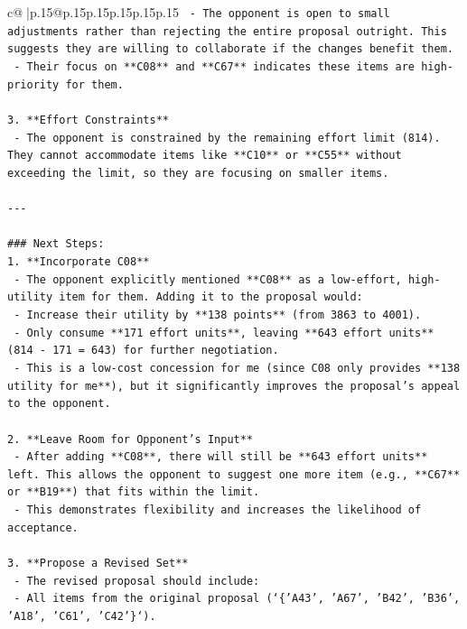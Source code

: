 \documentclass{article}
\begin{document}
{\begin{supertabular}{c@{$\;$}|p{.15\linewidth}@{}p{.15\linewidth}p{.15\linewidth}p{.15\linewidth}p{.15\linewidth}p{.15\linewidth}}
{{{\texttt{   {-} The opponent is open to small adjustments rather than rejecting the entire proposal outright. This suggests they are willing to collaborate if the changes benefit them.} \\
\texttt{   {-} Their focus on **C08** and **C67** indicates these items are high{-}priority for them.} \\
\\ 
\texttt{3. **Effort Constraints**} \\
\texttt{   {-} The opponent is constrained by the remaining effort limit (814). They cannot accommodate items like **C10** or **C55** without exceeding the limit, so they are focusing on smaller items.} \\
\\ 
\texttt{{-}{-}{-}} \\
\\ 
\texttt{\#\#\# Next Steps:} \\
\texttt{1. **Incorporate C08**} \\
\texttt{   {-} The opponent explicitly mentioned **C08** as a low{-}effort, high{-}utility item for them. Adding it to the proposal would:} \\
\texttt{     {-} Increase their utility by **138 points** (from 3863 to 4001).} \\
\texttt{     {-} Only consume **171 effort units**, leaving **643 effort units** (814 {-} 171 = 643) for further negotiation.} \\
\texttt{   {-} This is a low{-}cost concession for me (since C08 only provides **138 utility for me**), but it significantly improves the proposal’s appeal to the opponent.} \\
\\ 
\texttt{2. **Leave Room for Opponent’s Input**} \\
\texttt{   {-} After adding **C08**, there will still be **643 effort units** left. This allows the opponent to suggest one more item (e.g., **C67** or **B19**) that fits within the limit.} \\
\texttt{   {-} This demonstrates flexibility and increases the likelihood of acceptance.} \\
\\ 
\texttt{3. **Propose a Revised Set**} \\
\texttt{   {-} The revised proposal should include:} \\
\texttt{     {-} All items from the original proposal (`\{'A43', 'A67', 'B42', 'B36', 'A18', 'C61', 'C42'\}`).} \\
}}}
\end{supertabular}}
\end{document}
